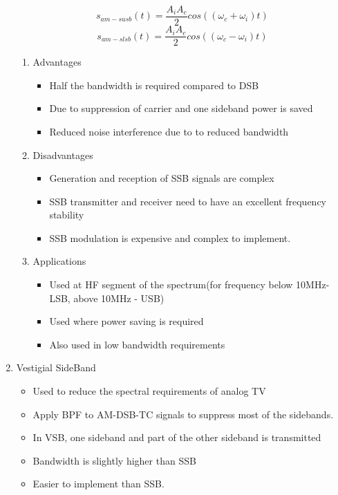 \documentclass[11pt]{report}
\begin{document}
\begin{enumerate}
$$s_{am-susb}(t) = \frac{A_iA_c}{2}cos((\omega_c + \omega_i)t)$$
$$s_{am-slsb}(t) = \frac{A_iA_c}{2}cos((\omega_c - \omega_i)t)$$
\begin{enumerate}
\item Advantages
\label{sec:org8e8114e}
\begin{itemize}
\item Half the bandwidth is required compared to DSB
\item Due to suppression of carrier and one sideband power is saved
\item Reduced noise interference due to to reduced bandwidth
\end{itemize}
\item Disadvantages
\label{sec:org170013c}
\begin{itemize}
\item Generation and reception of SSB signals are complex
\item SSB transmitter and receiver need to have an excellent frequency stability
\item SSB modulation is expensive and complex to implement.
\end{itemize}
\item Applications
\label{sec:org75daf04}
\begin{itemize}
\item Used at HF segment of the spectrum(for frequency below 10MHz-LSB, above 10MHz - USB)
\item Used where power saving is required
\item Also used in low bandwidth requirements
\end{itemize}
\end{enumerate}
\item Vestigial SideBand
\label{sec:org4c0cc86}
\begin{itemize}
\item Used to reduce the spectral requirements of analog TV
\item Apply BPF to AM-DSB-TC signals to suppress most of the sidebands.
\item In VSB, one sideband and part of the other sideband is transmitted
\item Bandwidth is slightly higher than SSB
\item Easier to implement than SSB.
\end{itemize}
\end{enumerate}
\end{document}
